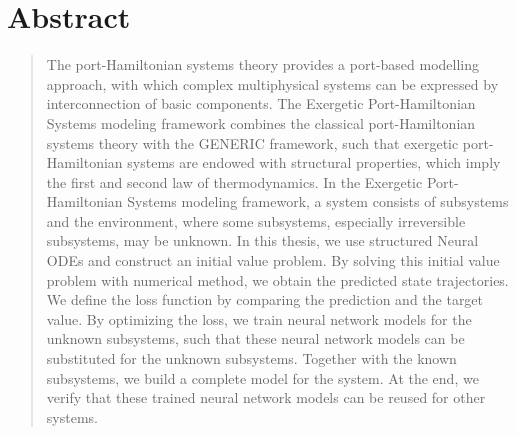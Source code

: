 \chapter*{Abstract}
\begin{quote}

The port-Hamiltonian systems theory provides a port-based modelling approach, with which complex multiphysical systems can be expressed by interconnection of basic components.  The Exergetic Port-Hamiltonian Systems modeling framework combines the classical port-Hamiltonian systems theory with the GENERIC framework, such that exergetic port-Hamiltonian systems are endowed with structural properties, which imply the first and second law of thermodynamics. In the Exergetic Port-Hamiltonian Systems modeling framework, a system consists of subsystems and the environment, where some subsystems, especially irreversible subsystems, may be unknown. In this thesis, we use structured Neural ODEs and construct an initial value problem. By solving this initial value problem with numerical method, we obtain the predicted state trajectories. We define the loss function by comparing the prediction and the target value. By optimizing the loss, we train neural network models for the unknown subsystems, such that these neural network models can be substituted for the unknown subsystems. Together with the known subsystems, we build a complete model for the system. At the end, we verify that these trained neural network models can be reused for other systems.

\end{quote}